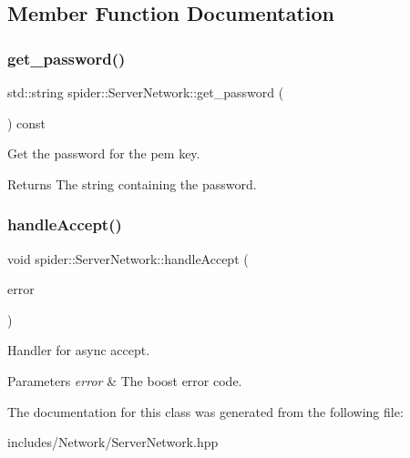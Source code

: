 \subsection{Member Function Documentation}
\mbox{\label{classspider_1_1_server_network_af177fc329a2be83ada20a9988025a7cd}} 
\subsubsection{\texorpdfstring{get\+\_\+password()}{get\_password()}}
{\footnotesize\ttfamily std\+::string spider\+::\+Server\+Network\+::get\+\_\+password (\begin{DoxyParamCaption}{ }\end{DoxyParamCaption}) const}



Get the password for the pem key. 

\begin{DoxyReturn}{Returns}
The string containing the password. 
\end{DoxyReturn}
\mbox{\label{classspider_1_1_server_network_a94a88f381fb5ab7c6f779615d14ebbb9}} 
\subsubsection{\texorpdfstring{handle\+Accept()}{handleAccept()}}
{\footnotesize\ttfamily void spider\+::\+Server\+Network\+::handle\+Accept (\begin{DoxyParamCaption}\item[{boost\+::system\+::error\+\_\+code const \&}]{error }\end{DoxyParamCaption})}



Handler for async accept. 


\begin{DoxyParams}{Parameters}
{\em error} & The boost error code. \\
\hline
\end{DoxyParams}


The documentation for this class was generated from the following file\+:\begin{DoxyCompactItemize}
\item 
includes/\+Network/Server\+Network.\+hpp\end{DoxyCompactItemize}

